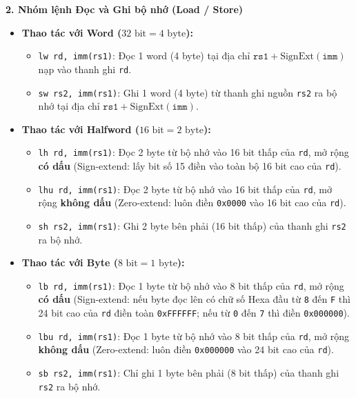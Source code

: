 \textbf{2. Nhóm lệnh Đọc và Ghi bộ nhớ (Load / Store)}
\begin{itemize}
    \item \textbf{Thao tác với Word ($32\text{ bit} = 4\text{ byte}$):}
    \begin{itemize}
        \item \texttt{lw rd, imm(rs1)}: Đọc 1 word (4 byte) tại địa chỉ $\texttt{rs1} + \text{SignExt}(\texttt{imm})$ nạp vào thanh ghi \texttt{rd}.
        \item \texttt{sw rs2, imm(rs1)}: Ghi 1 word (4 byte) từ thanh ghi nguồn \texttt{rs2} ra bộ nhớ tại địa chỉ $\texttt{rs1} + \text{SignExt}(\texttt{imm})$.
    \end{itemize}
    \item \textbf{Thao tác với Halfword ($16\text{ bit} = 2\text{ byte}$):}
    \begin{itemize}
        \item \texttt{lh rd, imm(rs1)}: Đọc 2 byte từ bộ nhớ vào 16 bit thấp của \texttt{rd}, mở rộng \textbf{có dấu} (Sign-extend: lấy bit số 15 điền vào toàn bộ 16 bit cao của \texttt{rd}).
        \item \texttt{lhu rd, imm(rs1)}: Đọc 2 byte từ bộ nhớ vào 16 bit thấp của \texttt{rd}, mở rộng \textbf{không dấu} (Zero-extend: luôn điền \texttt{0x0000} vào 16 bit cao của \texttt{rd}).
        \item \texttt{sh rs2, imm(rs1)}: Ghi 2 byte bên phải (16 bit thấp) của thanh ghi \texttt{rs2} ra bộ nhớ.
    \end{itemize}
    \item \textbf{Thao tác với Byte ($8\text{ bit} = 1\text{ byte}$):}
    \begin{itemize}
        \item \texttt{lb rd, imm(rs1)}: Đọc 1 byte từ bộ nhớ vào 8 bit thấp của \texttt{rd}, mở rộng \textbf{có dấu} (Sign-extend: nếu byte đọc lên có chữ số Hexa đầu từ \texttt{8} đến \texttt{F} thì 24 bit cao của \texttt{rd} điền toàn \texttt{0xFFFFFF}; nếu từ \texttt{0} đến \texttt{7} thì điền \texttt{0x000000}).
        \item \texttt{lbu rd, imm(rs1)}: Đọc 1 byte từ bộ nhớ vào 8 bit thấp của \texttt{rd}, mở rộng \textbf{không dấu} (Zero-extend: luôn điền \texttt{0x000000} vào 24 bit cao của \texttt{rd}).
        \item \texttt{sb rs2, imm(rs1)}: Chỉ ghi 1 byte bên phải (8 bit thấp) của thanh ghi \texttt{rs2} ra bộ nhớ.
    \end{itemize}
\end{itemize}

